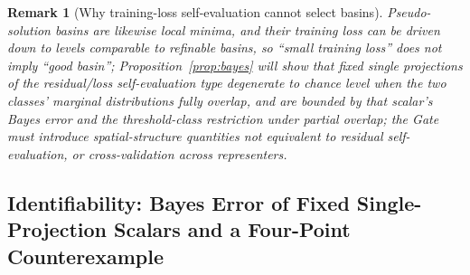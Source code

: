 \documentclass[11pt]{article}
\newtheorem*{remark}{Remark}
\numberwithin{equation}{section}
\begin{document}
\begin{remark}[Why training-loss self-evaluation cannot select basins]\label{rem:noground}
Pseudo-solution basins are likewise local minima, and their training loss can be driven down to levels comparable to refinable basins, so ``small training loss'' does not imply ``good basin''; Proposition~\ref{prop:bayes} will show that fixed single projections of the residual/loss self-evaluation type degenerate to chance level when the two classes' marginal distributions fully overlap, and are bounded by that scalar's Bayes error and the threshold-class restriction under partial overlap; the Gate must introduce spatial-structure quantities not equivalent to residual self-evaluation, or cross-validation across representers.
\end{remark}

\subsection{Identifiability: Bayes Error of Fixed Single-Projection Scalars and a Four-Point Counterexample}\label{sec:open}
\end{document}
